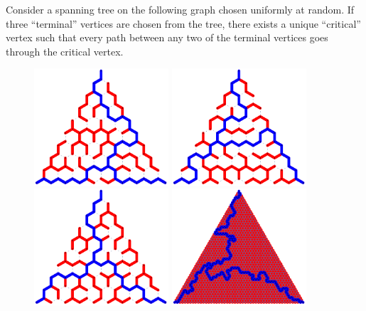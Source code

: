 \documentclass{article}
\begin{document}
Consider a spanning tree on the following graph chosen uniformly at random. If
three ``terminal'' vertices are chosen from the tree, there exists a unique ``critical'' vertex
such that every path between any two of the terminal vertices goes through the critical vertex.
\begin{figure}[ht!]
  \centering
  \includegraphics[width=5cm]{assets/126_problem/n_10_1.pdf}
  \includegraphics[width=5cm]{assets/126_problem/n_10_2.pdf}
  \includegraphics[width=5cm]{assets/126_problem/n_10_6.pdf}
  \includegraphics[width=5cm]{assets/126_problem/n_50_1.pdf}

\end{figure}
\end{document}
